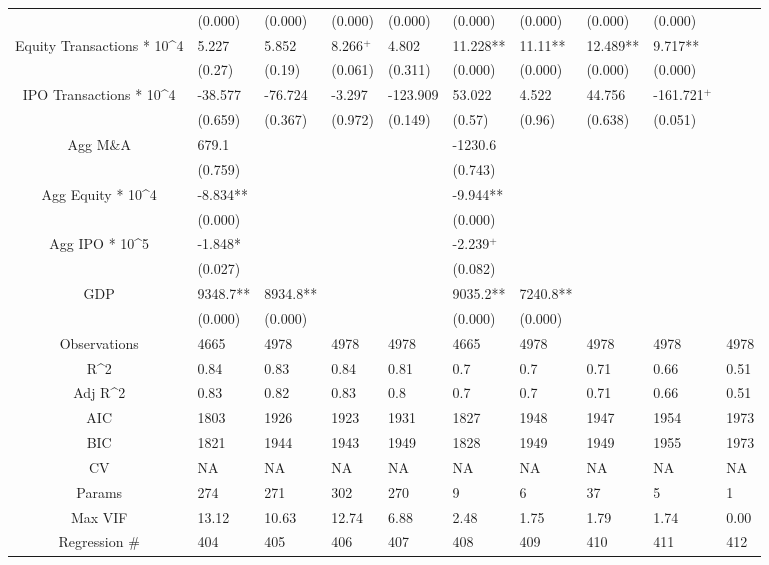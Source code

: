 \documentclass{article}
\begin{document}
\begin{table}[H]
\begin{tabular}{|clllllllll|}
   & (0.000) & (0.000) & (0.000) & (0.000) & (0.000) & (0.000) & (0.000) & (0.000) &  \\
  Equity Transactions * 10^4 & 5.227 & 5.852 & 8.266$^{+}$ & 4.802 & 11.228** & 11.11** & 12.489** & 9.717** &  \\
   & (0.27) & (0.19) & (0.061) & (0.311) & (0.000) & (0.000) & (0.000) & (0.000) &  \\
  IPO Transactions * 10^4 & -38.577 & -76.724 & -3.297 & -123.909 & 53.022 & 4.522 & 44.756 & -161.721$^{+}$ &  \\
   & (0.659) & (0.367) & (0.972) & (0.149) & (0.57) & (0.96) & (0.638) & (0.051) &  \\
  Agg M\&A & 679.1 &  &  &  & -1230.6 &  &  &  &  \\
   & (0.759) &  &  &  & (0.743) &  &  &  &  \\
  Agg Equity * 10^4 & -8.834** &  &  &  & -9.944** &  &  &  &  \\
   & (0.000) &  &  &  & (0.000) &  &  &  &  \\
  Agg IPO * 10^5 & -1.848* &  &  &  & -2.239$^{+}$ &  &  &  &  \\
   & (0.027) &  &  &  & (0.082) &  &  &  &  \\
  GDP & 9348.7** & 8934.8** &  &  & 9035.2** & 7240.8** &  &  &  \\
   & (0.000) & (0.000) &  &  & (0.000) & (0.000) &  &  &  \\
  \hline
 Observations & 4665 & 4978 & 4978 & 4978 & 4665 & 4978 & 4978 & 4978 & 4978 \\
  R^2 & 0.84 & 0.83 & 0.84 & 0.81 & 0.7 & 0.7 & 0.71 & 0.66 & 0.51 \\
  Adj R^2 & 0.83 & 0.82 & 0.83 & 0.8 & 0.7 & 0.7 & 0.71 & 0.66 & 0.51 \\
  AIC & 1803 & 1926 & 1923 & 1931 & 1827 & 1948 & 1947 & 1954 & 1973 \\
  BIC & 1821 & 1944 & 1943 & 1949 & 1828 & 1949 & 1949 & 1955 & 1973 \\
  CV & NA & NA & NA & NA & NA & NA & NA & NA & NA \\
  Params & 274 & 271 & 302 & 270 & 9 & 6 & 37 & 5 & 1 \\
  Max VIF & 13.12 & 10.63 & 12.74 & 6.88 & 2.48 & 1.75 & 1.79 & 1.74 & 0.00 \\
  Regression \# & 404 & 405 & 406 & 407 & 408 & 409 & 410 & 411 & 412 \\
   \hline
\end{tabular}

\end{table}
\end{document}
